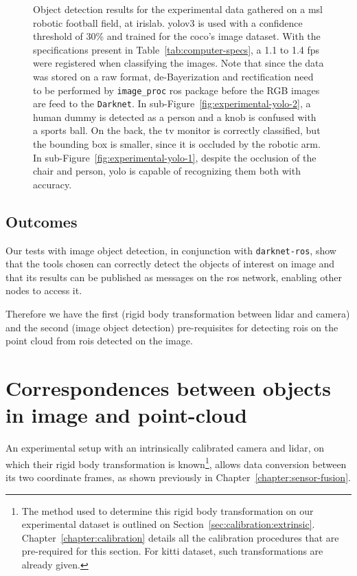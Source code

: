 \begin{figure}[!ht]
\begin{subfigure}[t]{0.45\textwidth}
	\end{subfigure}
	\caption[Image object detection, using \ac{yolo}v3 on our experimental dataset.]{Object detection results for the experimental data gathered on a \ac{msl} robotic football field, at \ac{irislab}. \ac{yolo}v3 is used with a confidence threshold of 30\% and trained for the \ac{coco}'s image dataset. With the specifications present in Table~\ref{tab:computer-specs}, a 1.1 to 1.4 \ac{fps} were registered when classifying the images. Note that since the data was stored on a raw format, de-Bayerization and rectification need to be performed by \texttt{image\_proc} \ac{ros} package before the RGB images are feed to the \texttt{Darknet}. In sub-Figure~\ref{fig:experimental-yolo-2}, a human dummy is detected as a person and a knob is confused with a sports ball. On the back, the tv monitor is correctly classified, but the bounding box is smaller, since it is occluded by the robotic arm. In sub-Figure~\ref{fig:experimental-yolo-1}, despite the occlusion of the chair and person, \ac{yolo} is capable of recognizing them both with accuracy.}
	\label{fig:experimental-object-detection}
\end{figure}

\subsection{Outcomes}
Our tests with image object detection, in conjunction with \texttt{darknet-ros}, show that the tools chosen can correctly detect the objects of interest on image and that its results can be published as messages on the \ac{ros} network, enabling other nodes to access it.

Therefore we have the first (rigid body transformation between \ac{lidar} and camera) and the second (image object detection) pre-requisites for detecting \acp{roi} on the point cloud from \acp{roi} detected on the image.

\section{Correspondences between objects in image and point-cloud}
\label{sec:object-detection:correspondences-image-point-cloud}
An experimental setup with an intrinsically calibrated camera and \ac{lidar}, on which their rigid body transformation is known\footnote{The method used to determine this rigid body transformation on our experimental dataset is outlined on Section~\ref{sec:calibration:extrinsic}. Chapter~\ref{chapter:calibration} details all the calibration procedures that are pre-required for this section. For \ac{kitti} dataset, such transformations are already given.}, allows data conversion between its two coordinate frames, as shown previously in Chapter~\ref{chapter:sensor-fusion}. 

